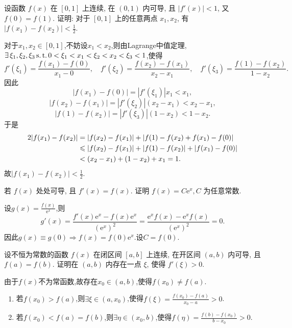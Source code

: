 \begin{exercise}[3.3.7]
    设函数 $f(x)$ 在 $[0,1]$ 上连续, 在 $(0,1)$ 内可导, 且 $|f'(x)| < 1$, 又 $f(0)=f(1)$. 证明: 对于 $[0,1]$ 上的任意两点 $x_1, x_2$, 有 $|f(x_1)-f(x_2)| < \frac{1}{2}$.
\end{exercise}

\begin{solution}
    对于$x_1,x_2 \in [0,1]$,不妨设$x_1 < x_2$,则由Lagrange中值定理,$\exists \xi_1,\xi_2,\xi_3 \st 0 < \xi_1 < x_1 < \xi_2 < x_2 < \xi_3 < 1$,使得
    $$
        f'(\xi_1) = \frac{f(x_1)-f(0)}{x_1-0}, \quad f'(\xi_2) = \frac{f(x_2)-f(x_1)}{x_2-x_1}, \quad f'(\xi_3) = \frac{f(1)-f(x_2)}{1-x_2}.
        $$
        因此$$|f(x_1)-f(0)| = |f'(\xi_1)|x_1 < x_1,$$
        $$|f(x_2)-f(x_1)| = |f'(\xi_2)|(x_2-x_1) < x_2 - x_1,$$
        $$|f(1)-f(x_2)| = |f'(\xi_3)|(1-x_2) < 1 - x_2.$$
        于是\begin{align*}
            2|f(x_1)-f(x_2)| & = |f(x_2)-f(x_1)| + |f(1)-f(x_2) + f(x_1)-f(0)| \\
                             & \leqslant |f(x_2)-f(x_1)| + |f(1)-f(x_2)| + |f(x_1)-f(0)| \\
                                & < (x_2 - x_1) + (1 - x_2) + x_1 = 1.
        \end{align*}
        故$|f(x_1)-f(x_2)| < \frac{1}{2}$.
\end{solution}

\begin{exercise}[3.3.8]
    若 $f(x)$ 处处可导, 且 $f'(x)=f(x)$. 证明 $f(x) = C\mathrm{e}^x, C$ 为任意常数.
\end{exercise}

\begin{solution}
    设$g(x) = \frac{f(x)}{\mathrm{e}^x}$,则
    $$
        g'(x) = \frac{f'(x)\mathrm{e}^x - f(x)\mathrm{e}^x}{(\mathrm{e}^x)^2} = \frac{\mathrm{e}^x f(x) - \mathrm{e}^x f(x)}{(\mathrm{e}^x)^2} = 0.
    $$
    因此$g(x) \equiv g(0) \Rightarrow f(x) = f(0)\mathrm{e}^x$.设$C = f(0)$.
\end{solution}

\begin{exercise}[3.3.9]
    设不恒为常数的函数 $f(x)$ 在闭区间 $[a,b]$ 上连续, 在开区间 $(a,b)$ 内可导, 且 $f(a)=f(b)$. 证明在 $(a,b)$ 内存在一点 $\xi$, 使得 $f'(\xi)>0$.
\end{exercise}

\begin{solution}
    由于$f(x)$不为常函数,故存在$x_0 \in (a,b)$,使得$f(x_0) \ne f(a)$.
    \begin{enumerate}
        \item 若$f(x_0) > f(a)$,则$\exists \xi \in (a,x_0)$,使得$f(\xi) = \frac{f(x_0)-f(a)}{x_0-a} > 0$.
        \item 若$f(x_0) < f(a)=f(b)$,则$\exists \eta \in (x_0,b)$,使得$f(\eta) = \frac{f(b)-f(x_0)}{b-x_0} > 0$.
    \end{enumerate}
\end{solution}

